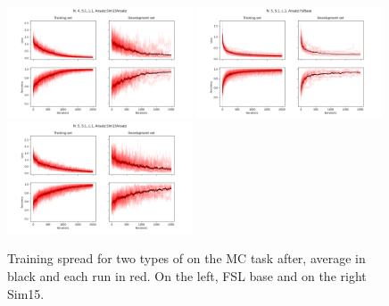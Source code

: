 \begin{figure}[h]
\includegraphics[width=0.49\textwidth]{figures/single_model/Sim15Ansatz/Epochs_2000--A_0.05--N_4--S_1--L_1.png}
\includegraphics[width=0.49\textwidth]{figures/single_model/FslBase/Epochs_2000--A_0.05--N_5--S_1--L_1--Ansatz_FslBase.png}
\includegraphics[width=0.49\textwidth]{figures/single_model/Sim15Ansatz/Epochs_2000--A_0.05--N_5--S_1--L_1.png}
\caption[Spread of \mya for small datasets]{Training spread for two types of \mya on the MC task after, average in black and each run in red. On the left, FSL base and on the right Sim15.}
\label{fig:testspread} 
\end{figure}
